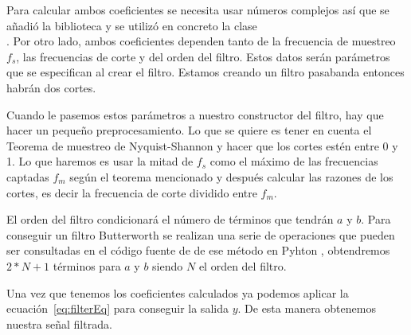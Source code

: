 Para calcular ambos coeficientes se necesita usar números complejos así que se añadió la biblioteca  y se utilizó en concreto la clase \\. Por otro lado, ambos coeficientes dependen tanto de la frecuencia de muestreo $f_s$, las frecuencias de corte y del orden del filtro. Estos datos serán parámetros que se especifican al crear el filtro. Estamos creando un filtro pasabanda entonces habrán dos cortes. 

Cuando le pasemos estos parámetros a nuestro constructor del filtro, hay que hacer un pequeño preprocesamiento. Lo que se quiere es tener en cuenta el Teorema de muestreo de Nyquist-Shannon y hacer que los cortes estén entre 0 y 1. Lo que haremos es usar la mitad de $f_s$ como el máximo de las frecuencias captadas $f_m$ según el teorema mencionado y después calcular las razones de los cortes, es decir la frecuencia de corte dividido entre $f_m$.

El orden del filtro condicionará el número de términos que tendrán $a$ y $b$. Para conseguir un filtro Butterworth se realizan una serie de operaciones que pueden ser consultadas en el código fuente de de ese método en Pyhton \cite{REF} %
, obtendremos $2*N+1$ términos para $a$ y $b$ siendo $N$ el orden del filtro.

Una vez que tenemos los coeficientes calculados ya podemos aplicar la ecuación~\ref{eq:filterEq} para conseguir la salida $y$. De esta manera obtenemos nuestra señal filtrada.




